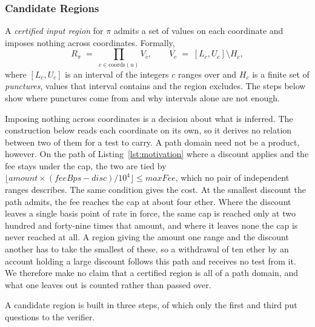 \documentclass[manuscript,anonymous]{acmart}
\begin{document}
\subsubsection{Candidate Regions}\label{sec:candidate}
A \emph{certified input region} for $\pi$ admits a set of values on each
coordinate and imposes nothing across coordinates. Formally,
\begin{equation}
R_\pi \;=\; \prod_{c \in \mathrm{coords}(u)} V_c ,
\qquad
V_c \;=\; [L_c, U_c] \setminus H_c ,
\label{eq:region}
\end{equation}
where $[L_c,U_c]$ is an interval of the integers $c$ ranges over and $H_c$ is a
finite set of \emph{punctures}, values that interval contains and the region
excludes. The steps below show where punctures come from and why intervals alone
are not enough.

Imposing nothing across coordinates is a decision about what is inferred. The
construction below reads each coordinate on its own, so it derives no relation
between two of them for a test to carry. A path domain need not be a product,
however. On the path of Listing~\ref{lst:motivation} where a discount applies
and the fee stays under the cap, the two are tied by
$\lfloor \mathit{amount} \times (\mathit{feeBps} - \mathit{disc}) / 10^{4}
\rfloor \leq \mathit{maxFee}$, which no pair of independent ranges describes.
The same condition gives the cost. At the smallest discount the
path admits, the fee reaches the cap at about four ether. Where the discount
leaves a single basis point of rate in force, the same cap is reached only at
two hundred and forty-nine times that amount, and where it leaves none the cap
is never reached at all. A region giving the amount one range and the discount
another has to take the smallest of these, so a withdrawal of ten ether by an
account holding a large discount follows this path and receives no test from it.
We therefore make no claim that a certified region is all of a path domain, and
what one leaves out is counted rather than passed over.

A candidate region is built in three steps, of which only the first and third
put questions to the verifier.
\end{document}
